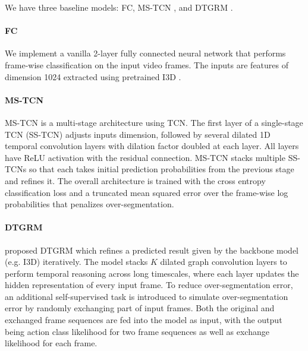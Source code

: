 We have three baseline models: FC, MS-TCN \cite{9186840}, and DTGRM \cite{wang2020temporal}. 


\paragraph{FC}
We implement a vanilla 2-layer fully connected neural network that performs frame-wise classification on the input video frames. The inputs are features of dimension 1024 extracted using pretrained I3D \cite{8099985}. 

\paragraph{MS-TCN}
MS-TCN \cite{8953830} is a multi-stage architecture using TCN. The first layer of a single-stage TCN (SS-TCN) adjusts inputs dimension, followed by several dilated 1D temporal convolution layers with dilation factor doubled at each layer. All layers have ReLU activation with the residual connection. MS-TCN stacks multiple SS-TCNs so that each takes initial prediction probabilities from the previous stage and refines it. The overall architecture is trained with the cross entropy classification loss and a truncated mean squared error over the frame-wise log probabilities that penalizes over-segmentation. 

\paragraph{DTGRM}
 proposed DTGRM which refines a predicted result given by the backbone model (e.g. I3D) iteratively. The model stacks $K$ dilated graph convolution layers to perform temporal reasoning across long timescales, where each layer updates the hidden representation of every input frame. To reduce over-segmentation error, an additional self-supervised task is introduced to simulate over-segmentation error by randomly exchanging part of input frames. Both the original and exchanged frame sequences are fed into the model as input, with the output being action class likelihood for two frame sequences as well as exchange likelihood for each frame. 

